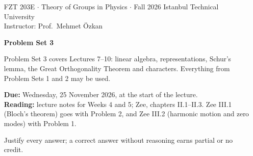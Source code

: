\documentclass[11pt,a4paper]{article}
\begin{document}
{\small FZT 203E $\cdot$ Theory of Groups in Physics $\cdot$ Fall 2026 \hfill Istanbul Technical University\\
Instructor: Prof.\ Mehmet Özkan}

\vspace{0.9em}
{\LARGE\bfseries Problem Set 3}

\vspace{0.5em}
Problem Set 3 covers Lectures 7--10: linear algebra, representations, Schur's lemma, the Great Orthogonality Theorem and characters. Everything from Problem Sets 1 and 2 may be used.

\textbf{Due:} Wednesday, 25 November 2026, at the start of the lecture.\\
\textbf{Reading:} lecture notes for Weeks 4 and 5; Zee, chapters II.1--II.3. Zee III.1 (Bloch's theorem) goes with Problem 2, and Zee III.2 (harmonic motion and zero modes) with Problem 1.

Justify every answer; a correct answer without reasoning earns partial or no credit.
\end{document}

